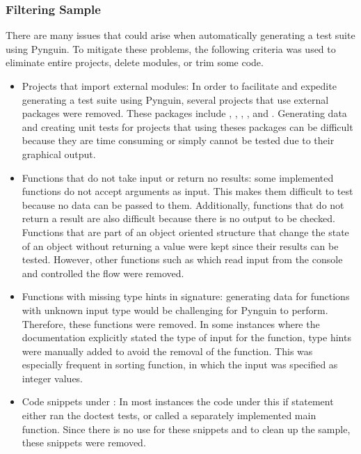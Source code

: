 \subsubsection{Filtering Sample}
\label{subsubsec:filtering_sample}

There are many issues that could arise when automatically generating a test
suite using Pynguin. To mitigate these problems, the following criteria was used
to eliminate entire projects, delete modules, or trim some code.

\begin{itemize}
    \item Projects that import external modules: In order to facilitate and
    expedite generating a test suite using Pynguin, several projects that use
    external packages were removed. These packages include ,
    , , , and .
    Generating data and creating unit tests for projects that using theses
    packages can be difficult because they are time consuming or simply cannot
    be tested due to their graphical output.
    \item Functions that do not take input or return no results: some implemented
    functions do not accept arguments as input. This makes them difficult to
    test because no data can be passed to them. Additionally, functions that do
    not return a result are also difficult because there is no output to be
    checked. Functions that are part of an object oriented structure that change
    the state of an object without returning a value were kept since their
    results can be tested. However, other functions such as  which
    read input from the console and controlled the flow were removed.
    \item Functions with missing type hints in signature: generating data for
    functions with unknown input type would be challenging for Pynguin to
    perform. Therefore, these functions were removed. In some instances where
    the documentation explicitly stated the type of input for the function, type
    hints were manually added to avoid the removal of the function. This was
    especially frequent in sorting function, in which the input was specified as
    integer values.
    \item Code snippets under : In most
    instances the code under this if statement either ran the doctest tests, or
    called a separately implemented main function. Since there is no use for
    these snippets and to clean up the sample, these snippets were removed.
\end{itemize}


